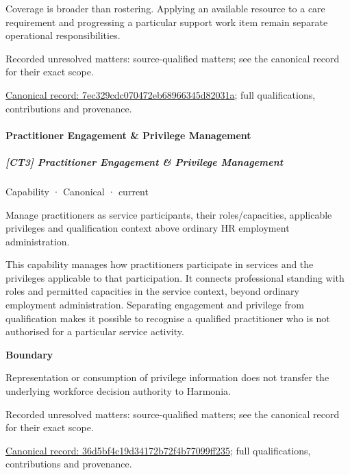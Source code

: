 Coverage is broader than rostering. Applying an available resource to a care requirement and progressing a particular support work item remain separate operational responsibilities.


{\small Recorded unresolved matters: source-qualified matters; see the canonical record for their exact scope.}\par
{\footnotesize \href{../../../../continuum/strategy/capability/7ec329cdc070472eb68966345d82031a.md}{Canonical record: 7ec329cdc070472eb68966345d82031a}; full qualifications, contributions and provenance.}\par
\paragraph{Practitioner Engagement \& Privilege Management}

\subparagraph{[CT3] Practitioner Engagement \& Privilege Management}

\label{element:36d5bf4c19d34172b72f4b77099ff235}
{\small Capability · Canonical · current}\par

Manage practitioners as service participants, their roles/capacities, applicable privileges and qualification context above ordinary HR employment administration.



This capability manages how practitioners participate in services and the privileges applicable to that participation. It connects professional standing with roles and permitted capacities in the service context, beyond ordinary employment administration. Separating engagement and privilege from qualification makes it possible to recognise a qualified practitioner who is not authorised for a particular service activity.



\textbf{Boundary}



Representation or consumption of privilege information does not transfer the underlying workforce decision authority to Harmonia.


{\small Recorded unresolved matters: source-qualified matters; see the canonical record for their exact scope.}\par
{\footnotesize \href{../../../../continuum/strategy/capability/36d5bf4c19d34172b72f4b77099ff235.md}{Canonical record: 36d5bf4c19d34172b72f4b77099ff235}; full qualifications, contributions and provenance.}\par
